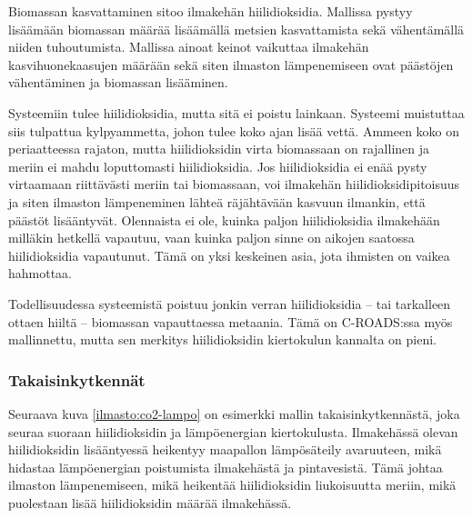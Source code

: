 \documentclass[finnish,12pt,a4paper,pdftex]{article}
\begin{document}
\begin{onehalfspacing}
Biomassan kasvattaminen sitoo ilmakehän hiilidioksidia. Mallissa pystyy lisäämään biomassan määrää lisäämällä metsien kasvattamista sekä vähentämällä niiden tuhoutumista. Mallissa ainoat keinot vaikuttaa ilmakehän kasvihuonekaasujen määrään sekä siten ilmaston lämpenemiseen ovat päästöjen vähentäminen ja biomassan lisääminen. \cite{Croads}

Systeemiin tulee hiilidioksidia, mutta sitä ei poistu lainkaan. Systeemi muistuttaa siis tulpattua kylpyammetta, johon tulee koko ajan lisää vettä. Ammeen koko on periaatteessa rajaton, mutta hiilidioksidin virta biomassaan on rajallinen ja meriin ei mahdu loputtomasti hiilidioksidia. Jos hiilidioksidia ei enää pysty virtaamaan riittävästi meriin tai biomassaan, voi ilmakehän hiilidioksidipitoisuus ja siten ilmaston lämpeneminen lähteä räjähtävään kasvuun ilmankin, että päästöt lisääntyvät. Olennaista ei ole, kuinka paljon hiilidioksidia ilmakehään milläkin hetkellä vapautuu, vaan kuinka paljon sinne on aikojen saatossa hiilidioksidia vapautunut. Tämä on yksi keskeinen asia, jota ihmisten on vaikea hahmottaa. \cite{CroadsFlightSimulator2011} 

Todellisuudessa systeemistä poistuu jonkin verran hiilidioksidia -- tai tarkalleen ottaen hiiltä -- biomassan vapauttaessa metaania. Tämä on C-ROADS:ssa myös mallinnettu, mutta sen merkitys hiilidioksidin kiertokulun kannalta on pieni. \cite{Croads}

\subsubsection{Takaisinkytkennät \label{ilmasto:croads:takaisinkytkennät}}

Seuraava kuva \ref{ilmasto:co2-lampo} on esimerkki mallin takaisinkytkennästä, joka seuraa suoraan hiilidioksidin ja lämpöenergian kiertokulusta. Ilmakehässä olevan hiilidioksidin lisääntyessä heikentyy maapallon lämpösäteily avaruuteen, mikä hidastaa lämpöenergian poistumista ilmakehästä ja pintavesistä. Tämä johtaa ilmaston lämpenemiseen, mikä heikentää hiilidioksidin liukoisuutta meriin, mikä puolestaan lisää hiilidioksidin määrää ilmakehässä. \cite{Croads, CroadsFlightSimulator2011}


\end{onehalfspacing}
\end{document}
